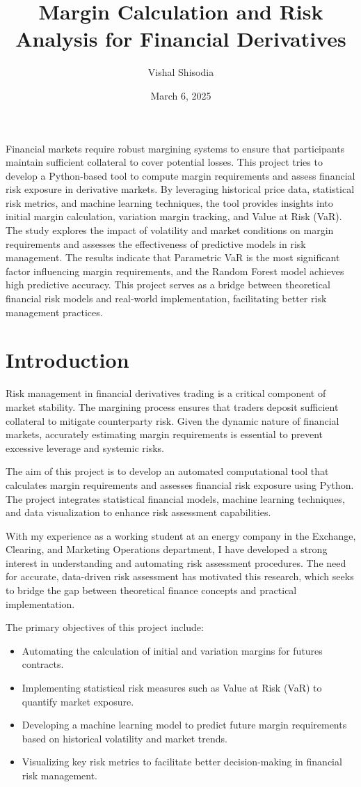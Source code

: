 \documentclass[a4paper,12pt]{article}
\title{\textbf{Margin Calculation and Risk Analysis for Financial Derivatives}}
\author{Vishal Shisodia}
\date{March 6, 2025}
\begin{document}
\maketitle


Financial markets require robust margining systems to ensure that participants maintain sufficient collateral to cover potential losses. This project tries to develop a Python-based tool to compute margin requirements and assess financial risk exposure in derivative markets. By leveraging historical price data, statistical risk metrics, and machine learning techniques, the tool provides insights into initial margin calculation, variation margin tracking, and Value at Risk (VaR). The study explores the impact of volatility and market conditions on margin requirements and assesses the effectiveness of predictive models in risk management. The results indicate that Parametric VaR is the most significant factor influencing margin requirements, and the Random Forest model achieves high predictive accuracy. This project serves as a bridge between theoretical financial risk models and real-world implementation, facilitating better risk management practices.


\section{Introduction}
Risk management in financial derivatives trading is a critical component of market stability. The margining process ensures that traders deposit sufficient collateral to mitigate counterparty risk. Given the dynamic nature of financial markets, accurately estimating margin requirements is essential to prevent excessive leverage and systemic risks.

The aim of this project is to develop an automated computational tool that calculates margin requirements and assesses financial risk exposure using Python. The project integrates statistical financial models, machine learning techniques, and data visualization to enhance risk assessment capabilities. 

With my experience as a working student at an energy company in the Exchange, Clearing, and Marketing Operations department, I have developed a strong interest in understanding and automating risk assessment procedures. The need for accurate, data-driven risk assessment has motivated this research, which seeks to bridge the gap between theoretical finance concepts and practical implementation. 

The primary objectives of this project include:
\begin{itemize}
    \item Automating the calculation of initial and variation margins for futures contracts.
    \item Implementing statistical risk measures such as Value at Risk (VaR) to quantify market exposure.
    \item Developing a machine learning model to predict future margin requirements based on historical volatility and market trends.
    \item Visualizing key risk metrics to facilitate better decision-making in financial risk management.
\end{itemize}
\end{document}
